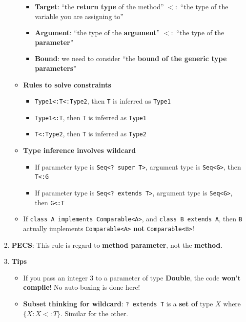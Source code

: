 \documentclass[10pt, landscape]{article}
\begin{document}
\begin{multicols}{4}
\begin{enumerate}
\begin{itemize}
        \begin{itemize}
            \item \textbf{Target}: ``the \textbf{return type} of the method'' $<:$ ``the type of the variable you are assigning to''
            \item \textbf{Argument}: ``the type of the \textbf{argument}'' $<:$ ``the type of the \textbf{parameter}''
            \item \textbf{Bound}: we need to consider ``the \textbf{bound of the generic type parameters}''
        \end{itemize}
        \item \textbf{Rules to solve constraints}
        \begin{itemize}
            \item \texttt{Type1<:T<:Type2}, then \texttt{T} is inferred as \texttt{Type1}
            \item \texttt{Type1<:T}, then \texttt{T} is inferred as \texttt{Type1}
            \item \texttt{T<:Type2}, then \texttt{T} is inferred as \texttt{Type2}
        \end{itemize}
        \item \textbf{Type inference involves wildcard}
        \begin{itemize}
            \item If parameter type is \texttt{Seq<? super T>}, argument type is \texttt{Seq<G>}, then \texttt{T<:G}
            \item If parameter type is \texttt{Seq<? extends T>}, argument type is \texttt{Seq<G>}, then \texttt{G<:T}
        \end{itemize}
        \item If \texttt{class A implements Comparable<A>}, and \texttt{class B extends A}, then \texttt{B} actually implements \texttt{Comparable<A>} \textbf{not} \texttt{Comparable<B>}!
    \end{itemize}
    \item \textbf{PECS}: This rule is regard to \textbf{method parameter}, not the \textbf{method}.
    \item \textbf{Tips}
    \begin{itemize}
        \item If you pass an integer 3 to a parameter of type \textbf{Double}, the code \textbf{won't compile}! No auto-boxing is done here!
        \item \textbf{Subset thinking for wildcard}: \texttt{? extends T} is a \textbf{set of} type $X$ where $\{X:X<:T\}$. Similar for the other.

\end{itemize}
\end{enumerate}
\end{multicols}
\end{document}
